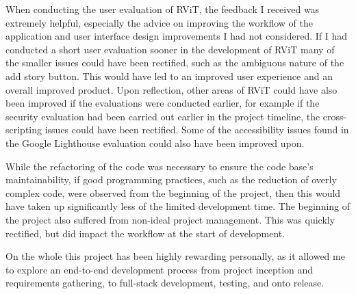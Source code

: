 \documentclass[l4proj.tex]{subfiles}
\begin{document}
When conducting the user evaluation of RViT, the feedback I received was extremely helpful, especially the advice on improving the workflow of the application and user interface design improvements I had not considered. If I had conducted a short user evaluation sooner in the development of RViT many of the smaller issues could have been rectified, such as the ambiguous nature of the add story button. This would have led to an improved user experience and an overall improved product. Upon reflection, other areas of RViT could have also been improved if the evaluations were conducted earlier, for example if the security evaluation had been carried out earlier in the project timeline, the cross-scripting issues could have been rectified. Some of the accessibility issues found in the Google Lighthouse evaluation could also have been improved upon.

While the refactoring of the code was necessary to ensure the code base's maintainability, if good programming practices, such as the reduction of overly complex code, were observed from the beginning of the project, then this would have taken up significantly less of the limited development time. The beginning of the project also suffered from non-ideal project management. This was quickly rectified, but did impact the workflow at the start of development.  

On the whole this project has been highly rewarding personally, as it allowed me to explore an end-to-end development process from project inception and requirements gathering, to full-stack development, testing, and onto release.
\end{document}
